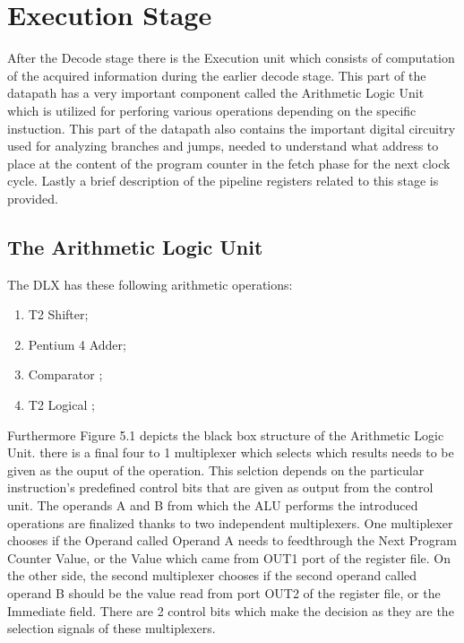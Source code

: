 \chapter{Execution Stage}
\label{ExecutionUnit}

After the Decode stage there is the Execution unit which consists of  computation of the acquired information during the earlier decode stage.
This part of the datapath has a very important component called the Arithmetic Logic Unit which is utilized for perforing various operations depending on the specific instuction.
This part of the datapath also contains the important digital circuitry used for analyzing branches and jumps, needed to understand what address to place 
at the content of the program counter in the fetch phase for the next clock cycle. Lastly a brief description of the pipeline registers related to this stage is provided.

\section{ The Arithmetic Logic Unit }
The DLX has these following arithmetic operations:
\begin{enumerate}
    \item T2 Shifter;
    \item Pentium 4 Adder;
    \item Comparator ;
    \item T2 Logical ;
    \end{enumerate}

Furthermore Figure 5.1 depicts the black box structure of the Arithmetic Logic Unit. there is a final four to 1 multiplexer which selects which results
needs to be given as the ouput of the operation. This selction depends on the particular instruction's predefined control bits that are given as output from the
control unit. The operands A and B from which the ALU performs the introduced operations are finalized thanks to two independent multiplexers. One multiplexer
chooses if the Operand called Operand A needs to feedthrough the Next Program Counter Value, or the Value which came from OUT1 port of the register file. On the other side,
the second multiplexer chooses if the second operand called operand B should be the value read from port OUT2 of the register file, or the Immediate field. There are 2 control
bits which make the decision as they are the selection signals of these multiplexers.

